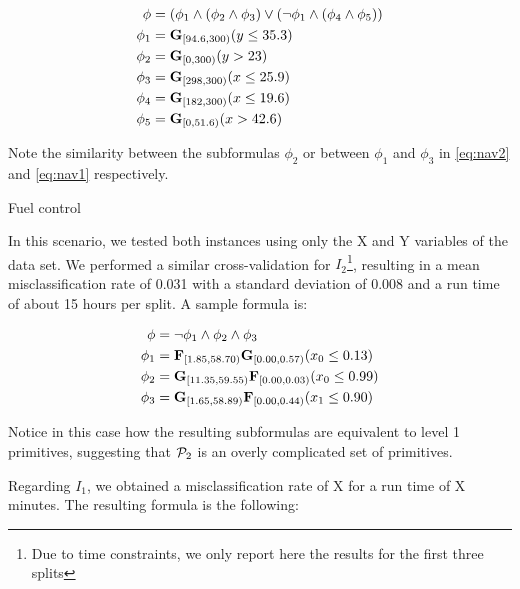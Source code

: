 \begin{equation}
    \label{eq:nav1}
\begin{aligned}
    \phi & = (\phi_1 \wedge (\phi_2 \wedge \phi_3 )  \vee ( \neg \phi_1 \wedge (\phi_4 \wedge \phi_5 )) \\
    \phi_1 & = \mathbf{G}_{[94.6,300)} (y\le35.3) \\
    \phi_2 & = \mathbf{G}_{[0,300)} (y>23) \\
    \phi_3 & = \mathbf{G}_{[298,300)} (x\le25.9) \\
    \phi_4 & = \mathbf{G}_{[182,300)} (x\le19.6) \\
    \phi_5 & = \mathbf{G}_{[0,51.6)} (x>42.6)
\end{aligned}
\end{equation}

Note the similarity between the subformulas $\phi_2$ or between $\phi_1$ and $\phi_3$ in \ref{eq:nav2} and \ref{eq:nav1} respectively.

Fuel control

In this scenario, we tested both instances using only the {\color{red} X and Y} variables of the data set. We performed a similar cross-validation for $I_2$\footnote{Due to time constraints, we only report here the results for the first three splits}, resulting in a mean misclassification rate of 0.031 with a standard deviation of 0.008 and a run time of about 15 hours per split. A sample formula is:

\begin{equation}
    \label{eq:fuel2}
\begin{aligned}
    \phi & =  \neg \phi_1 \wedge \phi_2 \wedge \phi_3 \\
    \phi_1 & = \mathbf{F}_{[1.85, 58.70)} \mathbf{G}_{[0.00, 0.57)} (x_0 \le 0.13) \\
    \phi_2 & = \mathbf{G}_{[11.35, 59.55)} \mathbf{F}_{[0.00, 0.03)} (x_0 \le 0.99) \\
    \phi_3 & = \mathbf{G}_{[1.65, 58.89)} \mathbf{F}_{[0.00, 0.44)} (x_1 \le 0.90) \\
\end{aligned}
\end{equation}

Notice in this case how the resulting subformulas are equivalent to level 1 primitives, suggesting that $\mathcal{P}_2$ is an overly complicated set of primitives.

Regarding $I_1$, we obtained a misclassification rate of {\color{red} X} for a run time of {\color{red} X} minutes. The resulting formula is the following:


